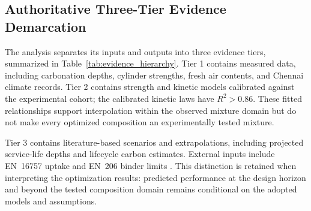 \documentclass[journal]{IEEEtran}
\begin{document}
\subsection{Authoritative Three-Tier Evidence Demarcation}
The analysis separates its inputs and outputs into three evidence tiers, summarized in Table~\ref{tab:evidence_hierarchy}. Tier 1 contains measured data, including carbonation depths, cylinder strengths, fresh air contents, and Chennai climate records. Tier 2 contains strength and kinetic models calibrated against the experimental cohort; the calibrated kinetic laws have $R^2 > 0.86$. These fitted relationships support interpolation within the observed mixture domain but do not make every optimized composition an experimentally tested mixture.

Tier 3 contains literature-based scenarios and extrapolations, including projected service-life depths and lifecycle carbon estimates. External inputs include EN~16757 uptake \cite{en16757} and EN~206 binder limits \cite{en206}. This distinction is retained when interpreting the optimization results: predicted performance at the design horizon and beyond the tested composition domain remains conditional on the adopted models and assumptions.
\end{document}
